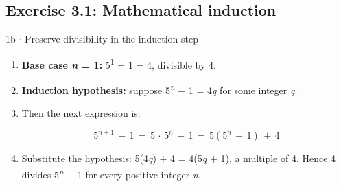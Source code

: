 \documentclass[11pt]{article}
\begin{document}
\begin{keepsection}\subsection{Exercise 3.1: Mathematical induction}

\begin{workedbox}{1b \ensuremath{\cdot} Preserve divisibility in the induction step}
\begin{enumerate}
\item \textbf{Base case \textit{n} = 1:} 5\textsuperscript{1} \ensuremath{-} 1 = 4, divisible by 4.
\item \textbf{Induction hypothesis:} suppose 5\textsuperscript{\textit{n}} \ensuremath{-} 1 = 4\textit{q} for some integer \textit{q}.
\item {}
Then the next expression is:

\begin{equation*}5^{{n}+1}\, -\, 1\, =\, 5\, \cdot \, 5^{{n}}\, -\, 1\, =\, 5(5^{{n}}\, -\, 1)\, +\, 4\end{equation*}
\item Substitute the hypothesis: 5(4\textit{q}) + 4 = 4(5\textit{q} + 1), a multiple of 4. Hence 4 divides 5\textsuperscript{\textit{n}} \ensuremath{-} 1 for every positive integer \textit{n}.
\end{enumerate}
\end{workedbox}

\end{keepsection}
\end{document}
